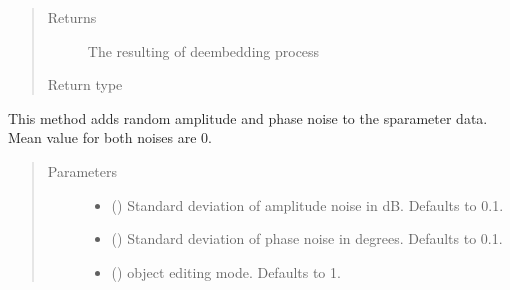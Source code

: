 \documentclass[letterpaper,10pt,english]{sphinxmanual}
\begin{document}
\begin{fulllineitems}
\begin{fulllineitems}
\begin{quote}
\begin{description}
\item[{Returns}] \leavevmode
The resulting of deembedding process

\item[{Return type}] \leavevmode
{\hyperref[\detokenize{touchstone:touchstone.spfile}]{}}

\end{description}\end{quote}

\end{fulllineitems}


\begin{fulllineitems}
\label{\detokenize{touchstone:touchstone.spfile.add_abs_noise}}
This method adds random amplitude and phase noise to the s\sphinxhyphen{}parameter data.
Mean value for both noises are 0.
\begin{quote}\begin{description}
\item[{Parameters}] \leavevmode\begin{itemize}
\item {} 
 (\sphinxstyleliteralemphasis{\sphinxupquote{, }}) \textendash{} Standard deviation of amplitude noise in dB. Defaults to 0.1.

\item {} 
 (\sphinxstyleliteralemphasis{\sphinxupquote{, }}) \textendash{} Standard deviation of phase noise in degrees. Defaults to 0.1.

\item {} 
 (\sphinxstyleliteralemphasis{\sphinxupquote{, }}) \textendash{} object editing mode. Defaults to \sphinxhyphen{}1.


\end{itemize}
\end{description}
\end{quote}
\end{fulllineitems}
\end{fulllineitems}
\end{document}
